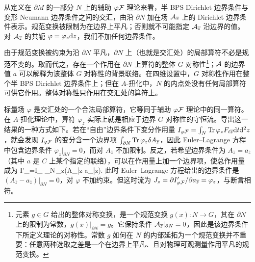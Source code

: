 从定义在 $\partial M$ 的一部分 $N$ 上的辅助 $\varphi {\mathcal F}$ 理论来看，半 BPS Dirichlet 边界条件与变形 Neumann 边界条件之间的交汇，由沿 $\partial N$ 加在场 ${\mathcal A}_{\overline z}$ 上的 Dirichlet 边界条件表示。规范变换被限制为在边界上平凡；否则就不可能指定 ${\mathcal A}_{\overline z}$ 沿边界的值。对 ${\mathcal A}_{\overline z}$ 的共轭 $\varphi=\varphi_z{\mathrm d} z$，我们不加任何边界条件。

由于规范变换被约束为沿 $\partial N$ 平凡，$\partial N$ 上（也就是交汇处）的局部算符不必是规范不变的。取而代之，存在一个作用在 $\partial N$ 上算符的整体 $G$ 对称性\footnote{\label{defglobal} 元素 $g\in G$ 给出的整体对称变换，是一个规范变换 $g(x):N\to G$，其在 $\partial N$ 上的限制为常数，$g(x)|_{\partial N}=g$。它保持条件 ${\mathcal A}_{\overline z}|_{\partial N}=0$，因此是该边界条件下所定义理论的对称性。常数 $g$ 如何在 $N$ 的内部延拓为一个规范变换并不重要：任意两种选取之差是一个在边界上平凡、且对物理可观测量作用平凡的规范变换。}；${\mathcal A}$ 的边界值 $a$ 可以解释为该整体 $G$ 对称性的背景联络。在四维设置中，$G$ 对称性作用在整个半 BPS Dirichlet 边界条件上；但在 $A$-扭化中，$N$ 的内点处没有任何局部算符可供它作用。整体对称性只作用在交汇处的算符上。

标量场 $\varphi$ 是交汇处的一个合法局部算符，它等同于辅助 $\varphi {\mathcal F}$ 理论中的同一算符。在 $A$-扭化理论中，算符 $\varphi_z$ 实际上就是相应于边界 $G$ 对称性的守恒流。导出这一结果的一种方式如下。若在“自由”边界条件下变分作用量 $I_{\varphi{\mathcal F}}=\int_N {\rm Tr}\,\varphi_z F_{t\overline z}{\mathrm d} t {\mathrm d}^2z$，就会发现 $I_{\varphi {\mathcal F}}$ 的变分含一个边界项 $\int_{\partial N} {\rm Tr}\,\varphi_z\delta A_{\overline z}$，因此 Euler–Lagrange 方程中包含边界条件 $\varphi_z|_{\partial N}=0$，而对 $A_{\bar z}$ 不加限制。反之，若希望边界条件为 $A_{\bar z}=a_{\bar z}$（其中 $a$ 是 $C$ 上某个指定的联络），可以在作用量上加一个边界项，使总作用量成为
\be\label{fullact} I'_{\varphi\cF}=I_{\varphi\cF}-\int_{\partial N}\Tr\,\varphi_z(A_{\bar z}-a_{\bar z}).\ee
此时 Euler–Lagrange 方程给出的边界条件是 $(A_{\bar z}-a_{\bar z})|_{\partial N}=0$，对 $\varphi$ 不加约束。但这时流为 $J_z=\partial I'_{\varphi{\mathcal F}}/\partial a_{\overline z}=\varphi_z$，与断言相符。

